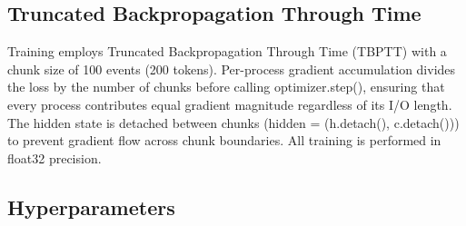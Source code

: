 \subsection{Truncated Backpropagation Through Time}\label{sec:3.5.2}

Training employs Truncated Backpropagation Through Time (TBPTT) \cite{ref45} with a chunk size of 100 events (200 tokens). Per-process gradient accumulation divides the loss by the number of chunks before calling optimizer.step(), ensuring that every process contributes equal gradient magnitude regardless of its I/\allowbreak{}O length. The hidden state is detached between chunks (hidden = (h.detach(), c.detach())) to prevent gradient flow across chunk boundaries. All training is performed in float32 precision.

\subsection{Hyperparameters}\label{sec:3.5.3}


